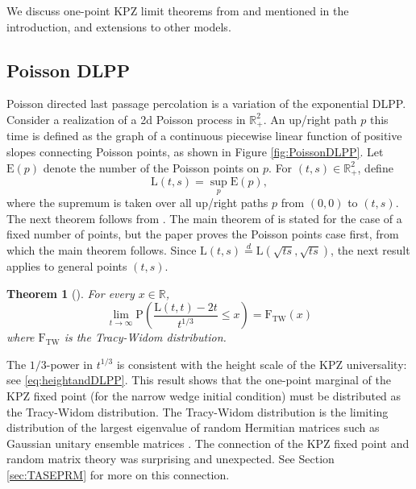 \documentclass[10pt]{article}
\theoremstyle{plain}
\newtheorem{theorem}{Theorem}[section]
\theoremstyle{definition}
\newcommand{\beqq}{ \begin{equation*} }
\newcommand{\eeqq}{ \end{equation*} }
\newcommand{\R}{\mathbb{R}}
\newcommand{\Prob}{\mathrm{P}}    %
\newcommand{\pE}{\mathrm{E}}  %
\newcommand{\pL}{\mathrm{L}}  %
\newcommand{\TW}{\mathrm{TW}}  %
\newcommand{\FTW}{\mathrm{F}_{\TW}}  %
\numberwithin{equation}{section}
\begin{document}
We discuss one-point KPZ limit theorems from \cite{Baik-Deift-Johansson99} and \cite{Johansson00} mentioned in the introduction, and extensions to other models. 

\subsection{Poisson DLPP}

Poisson directed last passage percolation is a variation of the exponential DLPP. 
Consider a realization of a 2d Poisson process in $\R_+^2$. 
An up/right path $p$ this time is defined as the graph of a continuous piecewise linear function of positive slopes connecting Poisson points, as shown in Figure \ref{fig:PoissonDLPP}. 
Let $\pE(p)$ denote the number of the Poisson points on $p$. 
For $(t, s)\in \R_+^2$, define
\beqq
	\pL(t,s) = \sup_{p} \pE(p), 
\eeqq
where the supremum is taken over all up/right paths $p$ from $(0,0)$ to $(t,s)$.
The next theorem follows from \cite{Baik-Deift-Johansson99}. 
The main theorem of \cite{Baik-Deift-Johansson99} is stated for the case of a fixed number of points, 
but the paper proves the Poisson points case first, from which the main theorem follows. 
Since $\pL(t,s) \stackrel{d}{=} \pL(\sqrt{ts}, \sqrt{ts})$, the next result applies to general points $(t,s)$. 



\begin{theorem}[\cite{Baik-Deift-Johansson99}] \label{thm:Poisson}
For every $x\in \R$, 
\beqq
	\lim_{t\to\infty} \Prob\left( \frac{\pL(t,t)-2t}{t^{1/3}}\le x \right) = \FTW (x)
\eeqq
where $\FTW$ is the Tracy-Widom distribution. 
\end{theorem}

The $1/3$-power in $t^{1/3}$ is consistent with the height scale of the KPZ universality: see \eqref{eq:heightandDLPP}. 
This result shows that the one-point marginal of the KPZ fixed point (for the narrow wedge initial condition) must be distributed as the Tracy-Widom distribution. 
The Tracy-Widom distribution is the limiting distribution of the largest eigenvalue of random Hermitian matrices such as Gaussian unitary ensemble matrices \cite{Tracy-Widom94}. 
The connection of the KPZ fixed point and random matrix theory was surprising and unexpected. See Section \ref{sec:TASEPRM} for more on this connection. 
\end{document}

